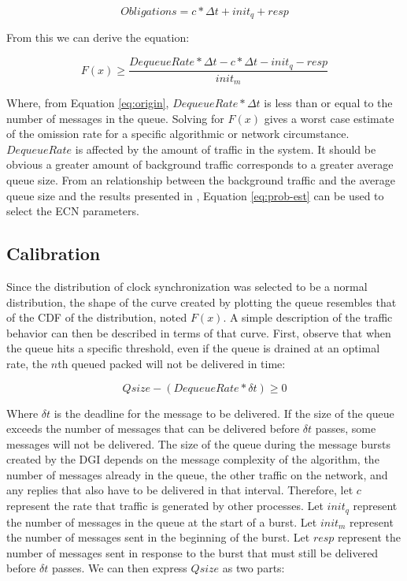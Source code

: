 \begin{equation}
Obligations = c * \Delta t + init_q + resp
\end{equation}

From this we can derive the equation:

\begin{equation}
F(x) \geq \frac{DequeueRate * \Delta t - c * \Delta t - init_q - resp}{init_m}
\label{eq:prob-est}
\end{equation}

Where, from Equation \ref{eq:origin}, $DequeueRate * \Delta t$ is less than or equal to the number of messages in the queue. 
Solving for $F(x)$ gives a worst case estimate of the omission rate for a specific algorithmic or network circumstance.
$DequeueRate$ is affected by the amount of traffic in the system. 
It should be obvious a greater amount of background traffic corresponds to a greater average queue size.
From an relationship between the background traffic and the average queue size and the results presented in \cite{JOURNAL}, Equation \ref{eq:prob-est} can be used to select the ECN parameters.


\subsection{Calibration}

Since the distribution of clock synchronization was selected to be a normal distribution, the shape of the curve created by plotting the queue resembles that of the \ac{CDF} of the distribution, noted $F(x)$.
A simple description of the traffic behavior can then be described in terms of that curve.
First, observe that when the queue hits a specific threshold, even if the queue is drained at an optimal rate, the $n$th queued packed will not be delivered in time:

\begin{equation}
Qsize - (DequeueRate * \delta t) \geq 0
\end{equation}

Where $\delta t$ is the deadline for the message to be delivered.
If the size of the queue exceeds the number of messages that can be delivered before $\delta t$ passes, some messages will not be delivered.
The size of the queue during the message bursts created by the DGI depends on the message complexity of the algorithm, the number of messages already in the queue, the other traffic on the network, and any replies that also have to be delivered in that interval.
Therefore, let $c$ represent the rate that traffic is generated by other processes.
Let $init_q$ represent the number of messages in the queue at the start of a burst. 
Let $init_m$ represent the number of messages sent in the beginning of the burst.
Let $resp$ represent the number of messages sent in response to the burst that must still be delivered before $\delta t$ passes.
We can then express $Qsize$ as two parts:

